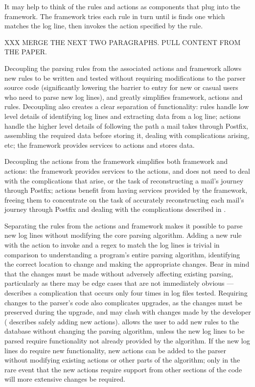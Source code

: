 It may help to think of the rules and actions as components that plug into
the framework.  The framework tries each rule in turn until is finds one
which matches the log line, then invokes the action specified by the rule.

\label{why separate rules, actions and framework?}

XXX MERGE THE NEXT TWO PARAGRAPHS\@.  PULL CONTENT FROM THE PAPER\@.

Decoupling the parsing rules from the associated actions and framework
allows new rules to be written and tested without requiring modifications
to the parser source code (significantly lowering the barrier to entry for
new or casual users who need to parse new log lines), and greatly
simplifies framework, actions and rules.  Decoupling also creates a clear
separation of functionality: rules handle low level details of identifying
log lines and extracting data from a log line; actions handle the higher
level details of following the path a mail takes through Postfix,
assembling the required data before storing it, dealing with complications
arising, etc; the framework provides services to actions and stores data.

Decoupling the actions from the framework simplifies both framework and
actions: the framework provides services to the actions, and does not need
to deal with the complications that arise, or the task of reconstructing a
mail's journey through Postfix; actions benefit from having services
provided by the framework, freeing them to concentrate on the task of
accurately reconstructing each mail's journey through Postfix and dealing
with the complications described in .

Separating the rules from the actions and framework makes it possible to
parse new log lines without modifying the core parsing algorithm.  Adding a
new rule with the action to invoke and a regex to match the log lines is
trivial in comparison to understanding a program's entire parsing
algorithm, identifying the correct location to change and making the
appropriate changes.  Bear in mind that the changes must be made without
adversely affecting existing parsing, particularly as there may be edge
cases that are not immediately obvious ---
 describes a complication
that occurs only four times in \numberOFlogFILES{} log files tested.
Requiring changes to the parser's code also complicates upgrades, as the
changes must be preserved during the upgrade, and may clash with changes
made by the developer ( describes safely
adding new actions).  \parsername{} allows the user to add new rules to the
database without changing the parsing algorithm, unless the new log lines
to be parsed require functionality not already provided by the algorithm.
If the new log lines do require new functionality, new actions can be added
to the parser without modifying existing actions or other parts of the
algorithm; only in the rare event that the new actions require support from
other sections of the code will more extensive changes be required.


